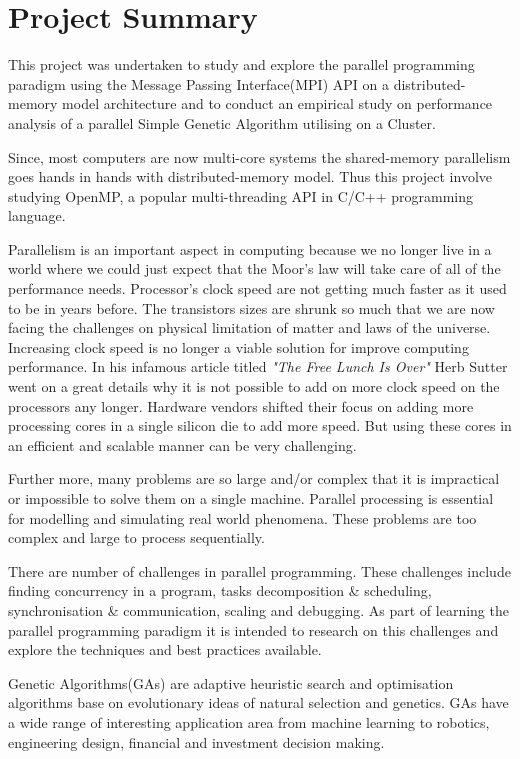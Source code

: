 \chapter{Project Summary}
\label{summary}
This project was undertaken to study and explore the parallel programming paradigm using the Message Passing Interface(MPI) API on a distributed-memory model architecture and to conduct an empirical study on performance analysis of a parallel Simple Genetic Algorithm utilising on a Cluster. 

Since, most computers are now multi-core systems the shared-memory parallelism goes hands in hands with distributed-memory model. Thus this project involve studying OpenMP, a popular multi-threading API in C/C++ programming language.

Parallelism is an important aspect in computing because we no longer live in a world where we could just expect that the Moor's law will take care of all of the performance needs. Processor's clock speed are not getting much faster as it used to be in years before. The transistors sizes are shrunk so much that we are now facing the challenges on physical limitation of matter and laws of the universe. Increasing clock speed is no longer a viable solution for improve computing performance. In his infamous article titled \textit{"The Free Lunch Is Over"} Herb Sutter went on a great details why it is not possible to add on more clock speed on the processors any longer\citep{Sutter:05}. Hardware vendors shifted their focus on adding more processing cores in a single silicon die to add more speed. But using these cores in an efficient and scalable manner can be very challenging.

Further more, many problems are so large and/or complex that  it is impractical or impossible to solve them on a single machine. Parallel processing is essential for modelling and simulating real world phenomena. These problems are too complex and large to process sequentially.

There are number of challenges in parallel programming. These challenges include finding concurrency in a program, tasks decomposition \& scheduling, synchronisation \& communication, scaling and debugging. As part of learning the parallel programming paradigm it is intended to research on this challenges and explore the techniques and best practices available.

Genetic Algorithms(GAs) are adaptive heuristic search and optimisation algorithms base on evolutionary ideas of natural selection and genetics. GAs have a wide range of interesting application area from machine learning to robotics, engineering design, financial and investment decision making.

